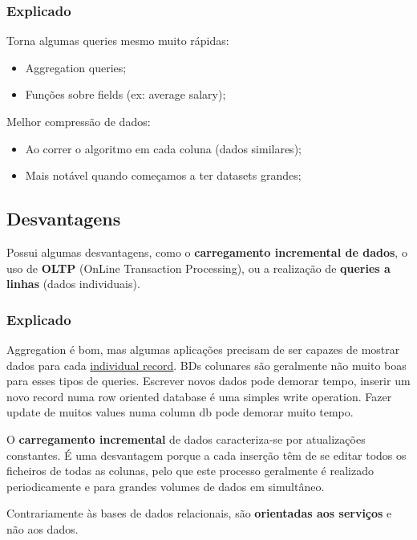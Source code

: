 \documentclass{article}
\begin{document}
\subsubsection{Explicado}
Torna algumas queries mesmo muito rápidas:
\begin{itemize}
  \item Aggregation queries;
  \item Funções sobre fields (ex: average salary);
\end{itemize}
Melhor compressão de dados:
\begin{itemize}
  \item Ao correr o algoritmo em cada coluna (dados similares);
  \item Mais notável quando começamos a ter datasets grandes;
\end{itemize}

\subsection{Desvantagens}
Possui algumas desvantagens, como o \textbf{carregamento incremental de dados}, o uso de \textbf{OLTP}
(OnLine Transaction Processing), ou a realização de \textbf{queries a linhas} (dados individuais).

\subsubsection{Explicado}

Aggregation é bom, mas algumas aplicações precisam de ser capazes de mostrar dados para
cada \uline{individual record}. BDs colunares são geralmente não muito boas para esses tipos de queries.
Escrever novos dados pode demorar tempo, inserir um novo record numa row oriented database é uma simples
write operation. Fazer update de muitos values numa column db pode demorar muito tempo.

\vspace{2mm}

O \textbf{carregamento incremental} de dados caracteriza-se por atualizações constantes. É uma desvantagem porque a cada
inserção têm de se editar todos os ficheiros de todas as colunas, pelo que este processo geralmente é realizado
periodicamente e para grandes volumes de dados em simultâneo.

\vspace{2mm}

Contrariamente às bases de dados relacionais, são \textbf{orientadas aos serviços}
e não aos dados.
\end{document}
